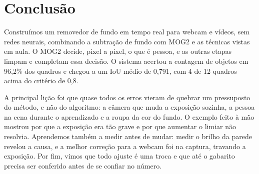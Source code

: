 \section{Conclusão}
\label{sec:conclusao}

Construímos um removedor de fundo em tempo real para webcam e vídeos,
sem redes neurais, combinando a subtração de fundo com MOG2 e as
técnicas vistas em aula. O MOG2 decide, pixel a pixel, o que é pessoa,
e as outras etapas limpam e completam essa decisão. O sistema acertou a
contagem de objetos em 96,2\% dos quadros e chegou a um IoU médio de
0,791, com 4 de 12 quadros acima do critério de 0,8.

A principal lição foi que quase todos os erros vieram de quebrar um
pressuposto do método, e não do algoritmo: a câmera que muda a
exposição sozinha, a pessoa na cena durante o aprendizado e a roupa da
cor do fundo. O exemplo feito à mão mostrou por que a exposição era tão
grave e por que aumentar o limiar não resolvia. Aprendemos também a
medir antes de mudar: medir o brilho da parede revelou a causa, e a
melhor correção para a webcam foi na captura, travando a exposição.
Por fim, vimos que todo ajuste é uma troca e que até o gabarito precisa
ser conferido antes de se confiar no número.
